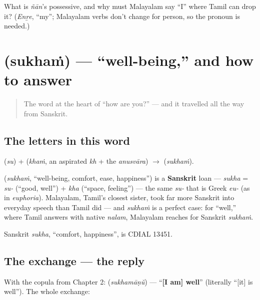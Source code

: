 \begin{tcolorbox}[breakable,colback=teal!4,colframe=teal!35!black,title={Before you move on}]
What is \emph{ñān}'s possessive, and why must Malayalam say \textquotedblleft{}I\textquotedblright{} where Tamil can drop it? (\emph{Enṟe}, \textquotedblleft{}my\textquotedblright{}; Malayalam verbs don't change for person, so the pronoun is needed.)
\end{tcolorbox}
\section[\texorpdfstring{\ml{സുഖം} (sukhaṁ)}{സുഖം (sukhaṁ)}]{ (sukhaṁ) — \textquotedblleft{}well-being,\textquotedblright{} and how to answer}

\label{lesson:ML-C03-sukham}



\begin{quote}
The word at the heart of \textquotedblleft{}how are you?\textquotedblright{} — and it travelled all the way from Sanskrit.
\end{quote}

\subsection*{The letters in this word}
\textbf{} (\emph{su}) + \textbf{} (\emph{khaṁ}, an aspirated \emph{kh} + the \emph{anusvāra}) $\to$ \textbf{} (\emph{sukhaṁ}).

\begin{cousinweb}
\textbf{} (\emph{sukhaṁ}, \textquotedblleft{}well-being, comfort, ease, happiness\textquotedblright{}) is a \textbf{Sanskrit} loan — \emph{sukha} = \emph{su-} (\textquotedblleft{}good, well\textquotedblright{}) + \emph{kha} (\textquotedblleft{}space, feeling\textquotedblright{}) — the same \emph{su-} that is Greek \emph{eu-} (as in \emph{euphoria}). Malayalam, Tamil's closest sister, took far more Sanskrit into everyday speech than Tamil did — and \emph{sukhaṁ} is a perfect case: for \textquotedblleft{}well,\textquotedblright{} where Tamil answers with native \emph{nalam}, Malayalam reaches for Sanskrit \emph{sukhaṁ}.

Sanskrit \emph{sukha}, \textquotedblleft{}comfort, happiness\textquotedblright{}, is CDIAL 13451.
\end{cousinweb}

\subsection*{The exchange — the reply}
With the copula from Chapter 2: \textbf{} (\emph{sukhamāṇŭ}) — \textquotedblleft{}\textbf{{[}I am{]} well}\textquotedblright{} (literally \textquotedblleft{}{[}it{]} is well\textquotedblright{}). The whole exchange:

